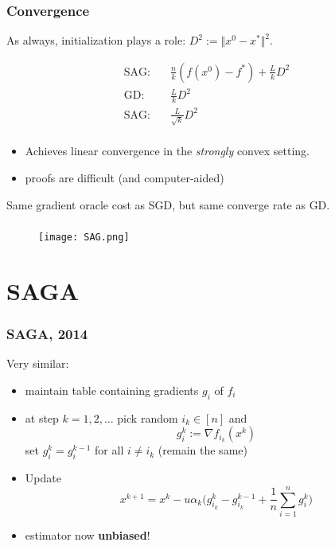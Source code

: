 \documentclass{beamer}
\begin{document}
\begin{frame}
  \frametitle{Convergence}
  As always, initialization plays a role: $D^2 := \Vert x^0 -x^* \Vert^2$.

  \begin{equation}
    \begin{aligned}
      \text{SAG:}& \quad \frac{n}{k}(f(x^0)-f^*) + \frac{L}{k}D^2 \\
      \text{GD:}& \quad \frac{L}{k}D^2 \\
      \text{SAG:}& \quad \frac{L}{\sqrt{k}}D^2 \\
    \end{aligned}
  \end{equation}
  \begin{itemize}
    \item Achieves linear convergence in the \emph{strongly} convex setting.
    \item proofs are difficult (and computer-aided)
  \end{itemize}


  \begin{center}
    Same gradient oracle cost as SGD, but same converge rate as GD.
  \end{center}
\end{frame}

\begin{frame}
  \frametitle{}
  \begin{figure}[ht]
    \centering
    \texttt{[image: SAG.png]}
    \caption{\label{fig:label} }
  \end{figure}

\end{frame}


\section{SAGA}%
\label{sec:}

\begin{frame}
  \frametitle{SAGA, 2014}
  Very similar:
  \begin{itemize}
    \item maintain table containing gradients $g_i$ of $f_i$
    \item at step $k = 1,2, \dots$ pick random $i_k \in [n]$ and
          \begin{equation}
            g_i^k := \nabla f_{i_k}(x^{k})
          \end{equation}
          set $g_{i}^k = g_i^{k-1}$ for all $i\neq i_k$ (remain the same)
    \item Update
          \begin{equation}
            x^{k+1} = x^k -u \alpha_k  \Big( g_{i_k}^k - g_{i_k}^{k-1} + \frac{1}{n}\sum_{i=1}^{n} g_i^k \Big)
          \end{equation}
    \item estimator now \textbf{unbiased}!
  \end{itemize}
\end{frame}
\end{document}
